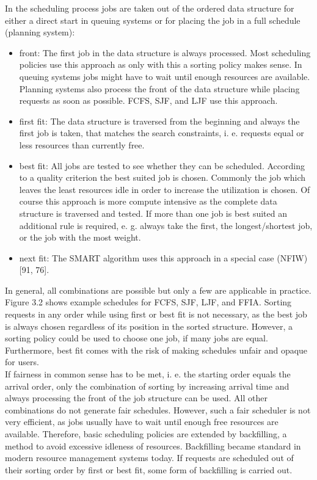 In the scheduling process jobs are taken out of the ordered data structure for either a direct start in queuing systems or for placing the job in a full schedule (planning system):
\begin{itemize}
\item front: The first job in the data structure is always processed. Most scheduling policies use this approach as only with this a sorting policy makes sense. In queuing systems jobs might have to wait until enough resources are available. Planning systems also process the front of the data structure while placing requests as soon as possible. FCFS, SJF, and LJF use this approach.
\item first fit: The data structure is traversed from the beginning and always the first job is taken, that matches the search constraints, i. e. requests equal or less resources than currently free.
\item best fit: All jobs are tested to see whether they can be scheduled. According to a quality criterion the best suited job is chosen. Commonly the job which leaves the least resources idle in order to increase the utilization is chosen. Of course this approach is more compute intensive as the complete data structure is traversed and tested. If more than one job is best suited an additional rule is required, e. g. always take the first, the longest/shortest job, or the job with the most weight.
\item next fit: The SMART algorithm uses this approach in a special case (NFIW) [91, 76].
\end{itemize}
In general, all combinations are possible but only a few are applicable in practice. Figure 3.2 shows example schedules for FCFS, SJF, LJF, and FFIA. Sorting requests in any order while using first or best fit is not necessary, as the best job is always chosen regardless of its position in the sorted structure. However, a sorting policy could be used to choose one job, if many jobs are equal. Furthermore, best fit comes with the risk of making schedules unfair and opaque for users.\\

If fairness in common sense has to be met, i. e. the starting order equals the arrival order, only the combination of sorting by increasing arrival time and always processing the front of the job structure can be used. All other combinations do not generate fair schedules. However, such a fair scheduler is not very efficient, as jobs usually have to wait until enough free resources are available. Therefore, basic scheduling policies are extended by backfilling, a method to avoid excessive idleness of resources. Backfilling became standard in modern resource management systems today. If requests are scheduled out of their sorting order by first or best fit, some form of backfilling is carried out.

